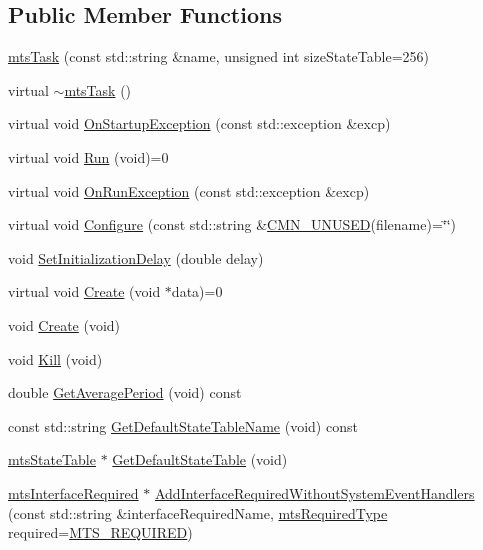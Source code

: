 \subsection*{Public Member Functions}
\begin{DoxyCompactItemize}
\item 
\hyperlink{classmts_task_a984edec80b837edc155eebc67092faf0}{mts\-Task} (const std\-::string \&name, unsigned int size\-State\-Table=256)
\item 
virtual \hyperlink{classmts_task_a7a3b50f50f6763c1c0bc5891ec51e32f}{$\sim$mts\-Task} ()
\item 
virtual void \hyperlink{classmts_task_aa600105632635600a684541c06a2924b}{On\-Startup\-Exception} (const std\-::exception \&excp)
\item 
virtual void \hyperlink{classmts_task_a20e18c9479cb650792456c32ee689834}{Run} (void)=0
\item 
virtual void \hyperlink{classmts_task_a58a8ec774820a2e527cf6f5ecdca5842}{On\-Run\-Exception} (const std\-::exception \&excp)
\item 
virtual void \hyperlink{classmts_task_a52c822f34f12a0eb14f3d02de9ddd6f6}{Configure} (const std\-::string \&\hyperlink{cmn_portability_8h_a021894e2626935fa2305434b1e893ff6}{C\-M\-N\-\_\-\-U\-N\-U\-S\-E\-D}(filename)=\char`\"{}\char`\"{})
\item 
void \hyperlink{classmts_task_ae1ddab5da6257ef89e546ef45a651d6b}{Set\-Initialization\-Delay} (double delay)
\item 
virtual void \hyperlink{classmts_task_aa051581f8b5c35105d595d7a46ccbe17}{Create} (void $\ast$data)=0
\item 
void \hyperlink{classmts_task_abc1a625d025c1038fa48137f0ba53465}{Create} (void)
\item 
void \hyperlink{classmts_task_a67a15d7fffef28708b813e2ea624e4f8}{Kill} (void)
\item 
double \hyperlink{classmts_task_ad3536c42140e452a4deb6b5a6f7bf629}{Get\-Average\-Period} (void) const 
\item 
const std\-::string \hyperlink{classmts_task_a46a4b088bfae45d795d3c3408db95b96}{Get\-Default\-State\-Table\-Name} (void) const 
\item 
\hyperlink{classmts_state_table}{mts\-State\-Table} $\ast$ \hyperlink{classmts_task_ad36b9bceda5769e3552769c0047a7bf9}{Get\-Default\-State\-Table} (void)
\item 
\hyperlink{classmts_interface_required}{mts\-Interface\-Required} $\ast$ \hyperlink{classmts_task_a00af25054306741c82c9b3ea2b234cce}{Add\-Interface\-Required\-Without\-System\-Event\-Handlers} (const std\-::string \&interface\-Required\-Name, \hyperlink{mts_forward_declarations_8h_a9ef1ce54724afde7802db326ff8606f3}{mts\-Required\-Type} required=\hyperlink{mts_forward_declarations_8h_a9ef1ce54724afde7802db326ff8606f3ae01fd85391b60e546bbb1be9716c4ec9}{M\-T\-S\-\_\-\-R\-E\-Q\-U\-I\-R\-E\-D})

\end{DoxyCompactItemize}
